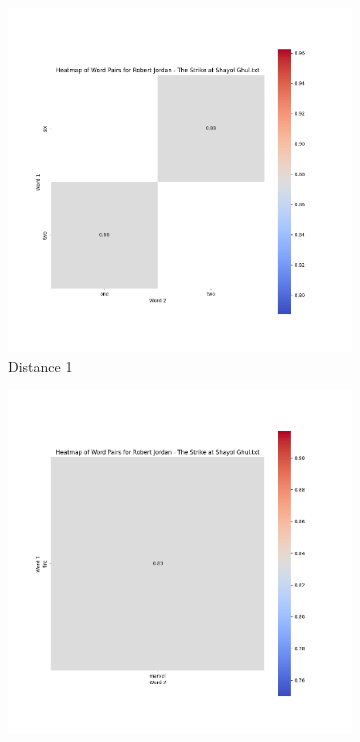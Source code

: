 \documentclass{article}
\begin{document}
\begin{figure}[H]
    \centering
    \begin{subfigure}[b]{0.3\textwidth}
        \includegraphics[width=\textwidth]{img/heatmap1.png}
        \caption{Distance 1}
        \label{fig:heatmap_1}
    \end{subfigure}
    \hfill
    \begin{subfigure}[b]{0.3\textwidth}
        \includegraphics[width=\textwidth]{img/heatmap2.png}

\end{subfigure}
\end{figure}
\end{document}
